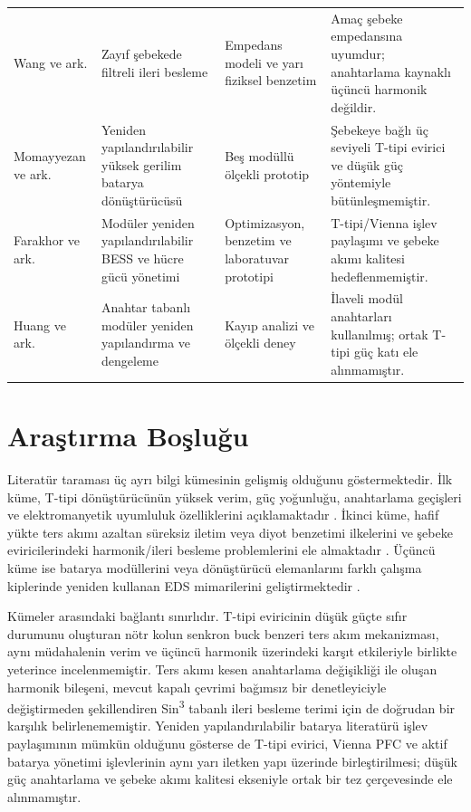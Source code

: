 \begin{longtable}{>{\raggedright\arraybackslash}p{} >{\raggedright\arraybackslash}p{} >{\raggedright\arraybackslash}p{} >{\raggedright\arraybackslash}p{}}
Wang ve ark. \citep{Wang2024} & Zayıf şebekede filtreli ileri besleme & Empedans modeli ve yarı fiziksel benzetim & Amaç şebeke empedansına uyumdur; anahtarlama kaynaklı üçüncü harmonik değildir. \\
Momayyezan ve ark. \citep{Momayyezan2016} & Yeniden yapılandırılabilir yüksek gerilim batarya dönüştürücüsü & Beş modüllü ölçekli prototip & Şebekeye bağlı üç seviyeli T-tipi evirici ve düşük güç yöntemiyle bütünleşmemiştir. \\
Farakhor ve ark. \citep{Farakhor2023} & Modüler yeniden yapılandırılabilir BESS ve hücre gücü yönetimi & Optimizasyon, benzetim ve laboratuvar prototipi & T-tipi/Vienna işlev paylaşımı ve şebeke akımı kalitesi hedeflenmemiştir. \\
Huang ve ark. \citep{Huang2024} & Anahtar tabanlı modüler yeniden yapılandırma ve dengeleme & Kayıp analizi ve ölçekli deney & İlaveli modül anahtarları kullanılmış; ortak T-tipi güç katı ele alınmamıştır. \\
\end{longtable}

\section{Araştırma Boşluğu}

Literatür taraması üç ayrı bilgi kümesinin gelişmiş olduğunu göstermektedir. İlk küme, T-tipi dönüştürücünün yüksek verim, güç yoğunluğu, anahtarlama geçişleri ve elektromanyetik uyumluluk özelliklerini açıklamaktadır \citep{Schweizer2013,Wang2020,Hizarci2021}. İkinci küme, hafif yükte ters akımı azaltan süreksiz iletim veya diyot benzetimi ilkelerini ve şebeke eviricilerindeki harmonik/ileri besleme problemlerini ele almaktadır \citep{Chen2010,Lu2016,Wang2024}. Üçüncü küme ise batarya modüllerini veya dönüştürücü elemanlarını farklı çalışma kiplerinde yeniden kullanan EDS mimarilerini geliştirmektedir \citep{Momayyezan2016,Farakhor2023,Huang2024}.

Kümeler arasındaki bağlantı sınırlıdır. T-tipi eviricinin düşük güçte sıfır durumunu oluşturan nötr kolun senkron buck benzeri ters akım mekanizması, aynı müdahalenin verim ve üçüncü harmonik üzerindeki karşıt etkileriyle birlikte yeterince incelenmemiştir. Ters akımı kesen anahtarlama değişikliği ile oluşan harmonik bileşeni, mevcut kapalı çevrimi bağımsız bir denetleyiciyle değiştirmeden şekillendiren Sin\textsuperscript{3} tabanlı ileri besleme terimi için de doğrudan bir karşılık belirlenememiştir. Yeniden yapılandırılabilir batarya literatürü işlev paylaşımının mümkün olduğunu gösterse de T-tipi evirici, Vienna PFC ve aktif batarya yönetimi işlevlerinin aynı yarı iletken yapı üzerinde birleştirilmesi; düşük güç anahtarlama ve şebeke akımı kalitesi ekseniyle ortak bir tez çerçevesinde ele alınmamıştır.

